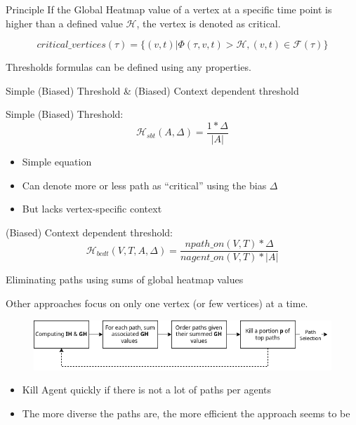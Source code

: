 \begin{frame}{Principle}
    If the Global Heatmap value of a vertex at a specific time point is higher than a defined value \(\mathcal{H}\), the vertex is denoted as critical.
    
    \[
    critical\_vertices(\tau) = \{(v,t) | \Phi(\tau,v,t) > \mathcal{H}, (v,t) \in \mathcal{F}(\tau) \}
    \]

    Thresholds formulas can be defined using any properties.
\end{frame}


\begin{frame}{Simple (Biased) Threshold \& (Biased) Context dependent threshold}
    
    Simple (Biased) Threshold:\\[0.5cm]
    \[
        \mathcal{H}_{sbt}(A,\Delta) =  \frac{1*\Delta}{|A|}
    \]

    \begin{itemize}
        \item Simple equation
        \item Can denote more or less path as ``critical'' using the bias \(\Delta\)
        \item But lacks vertex-specific context
    \end{itemize}
    
    (Biased) Context dependent threshold:\\[0.5cm]
    \[
        \mathcal{H}_{bcdt}(V,T,A,\Delta) = \frac{npath\_on(V,T)*\Delta}{nagent\_on(V,T) * |A|}    
    \]

\end{frame}

\begin{frame}{Eliminating paths using sums of global heatmap values}
    
    Other approaches focus on only one vertex (or few vertices)  at a time.

    \begin{figure}[H]
        \includegraphics[width=\widthimg]{img/summed_heatmap_value.drawio.png}
    \end{figure}

    \begin{itemize}
        \item Kill Agent quickly if there is not a lot of paths per agents
        \item The more diverse the paths are, the more efficient the approach seems to be
    \end{itemize}

\end{frame}


